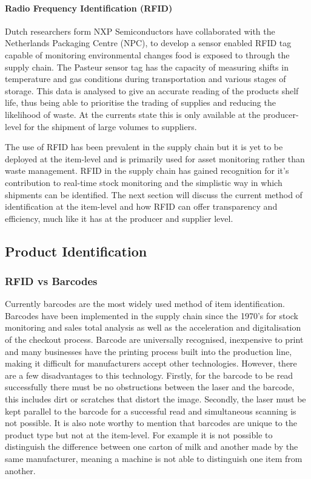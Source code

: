 \documentclass[a4paper, 11pt]{article}
\begin{document}
\paragraph{Radio Frequency Identification (RFID)}
Dutch researchers form NXP Semiconductors have collaborated with the Netherlands Packaging Centre (NPC),  to develop a sensor enabled RFID tag capable of monitoring environmental changes food is exposed to through the supply chain. The Pasteur sensor tag has the capacity of measuring shifts in temperature and gas conditions during transportation and various stages of storage. This data is analysed to give an accurate reading of the products shelf life, thus being able to prioritise the trading of supplies and reducing the likelihood of waste. At the currents state this is only available at the producer-level for the shipment of large volumes to suppliers. 

The use of RFID has been prevalent in the supply chain but it is yet to be deployed at the item-level and is primarily used for asset monitoring rather than waste management. RFID in the supply chain has gained recognition for it's contribution to real-time stock monitoring and the simplistic way in which shipments can be identified. The next section will discuss the current method of identification at the item-level and how RFID can offer transparency and efficiency, much like it has at the producer and supplier level.


\vspace{\baselineskip}
\vspace{\baselineskip}
\vspace{\baselineskip}

\subsection{Product Identification}

\subsubsection{RFID vs Barcodes}Currently barcodes are the most widely used method of item identification. Barcodes have been implemented in the supply chain since the 1970's for stock monitoring and sales total analysis as well as the acceleration and digitalisation of the checkout process. Barcode are universally recognised, inexpensive to print and many businesses have the printing process built into the production line, making it difficult for manufacturers accept other technologies. However, there are a few disadvantages to this technology. Firstly, for the barcode to be read successfully there must be no obstructions between the laser and the barcode, this includes dirt or scratches that distort the image. Secondly, the laser must be kept parallel to the barcode for a successful read and simultaneous scanning is not possible. It is also note worthy to mention that barcodes are unique to the product type but not at the item-level. For example it is not possible to distinguish the difference between one carton of milk and another made by the same manufacturer, meaning a machine is not able to distinguish one item from another.
\end{document}
